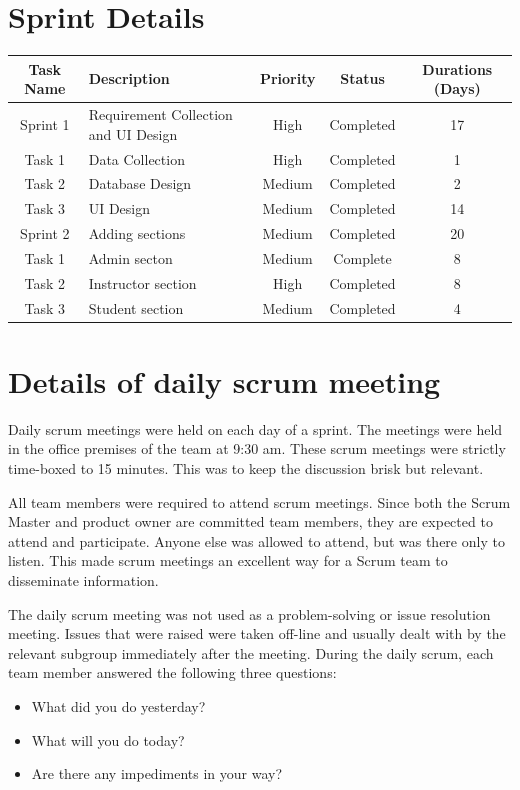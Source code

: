 \section{Sprint Details}
%
\renewcommand{\arraystretch}{1.25}
\begin{center}
\begin{tabular}{|c|p{4cm}|c|c|c|}
\hline
{\bf Task Name	} & {\bf Description} & {\bf Priority}	& {\bf Status} & {\bf 	Durations (Days)}\\
\hline
Sprint 1 & Requirement Collection and UI Design    &  High     &  Completed  &	 17\\
\hline
Task 1   &	Data Collection  &  High     &  Completed  &  1\\
\hline
Task 2	 & Database Design   &  Medium	&  Completed  &	 2\\
\hline
Task 3	 & UI Design    &  Medium   &  Completed  &	14\\
\hline
Sprint 2	 & Adding sections     &  Medium	&  Completed  &  20\\
\hline
Task 1	 & Admin secton    &  Medium	&  Complete   &  8\\
\hline
Task 2  	 & Instructor section	  &  High	    &  Completed  &  8\\
\hline
Task 3   	& Student  section	  &   Medium	&  Completed  & 4\\
\hline
\end{tabular}
\end{center}
\renewcommand{\arraystretch}{1}
%
\section{Details of daily scrum meeting}
%
Daily scrum meetings were held on each day of a sprint. The meetings were held in the office premises of the team at 9:30 am. These scrum meetings were strictly time-boxed to 15 minutes. This was to keep the discussion brisk but relevant.

All team members were required to attend scrum meetings. Since both the Scrum Master and product owner are committed team members, they are expected to attend and participate. Anyone else was allowed to attend, but was there only to listen. This made scrum meetings an excellent way for a Scrum team to disseminate information.

The daily scrum meeting was not used as a problem-solving or issue resolution meeting. Issues that were raised were taken off-line and usually dealt with by the relevant subgroup immediately after the meeting. During the daily scrum, each team member answered the following three questions:
\begin{itemize}
\item
    What did you do yesterday?
\item
    What will you do today?
\item
    Are there any impediments in your way?
\end{itemize}

